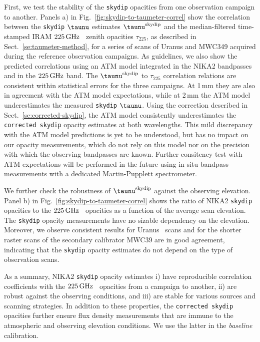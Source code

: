 First, we test the stability of the {\tt skydip} opacities from one
observation campaign to
another. Panels a) in Fig.~\ref{fig:skydip-to-taumeter-correl} show the
correlation between the {\tt skydip} $\taunu$ estimates $\taunu^{\rm{skydip}}$
and the median-filtered time-stamped IRAM $225\,\rm{GHz}$ \taumeter\ 
zenith opacities $\tau_{225}$, as described in
Sect.~\ref{se:taumeter-method}, for a series of scans
of Uranus and MWC349 acquired during the {\emph reference} observation
campaigns. As guidelines,
we also show the predicted correlations using an ATM model integrated
in the NIKA2 bandpasses and in the $225\,\rm{GHz}$ band. {\lp The
$\taunu^{\rm{skydip}}$ to $\tau_{225}$ correlation relations are
consistent within statistical errors for the three campaigns.}
At 1\,mm they are also in agreement with the ATM model expectations,
while at 2\,mm the ATM model underestimates the measured {\tt skydip}
$\taunu$. {\lp Using the correction described in
Sect.~\ref{se:corrected-skydip}, the ATM
model consistently underestimates the {\tt corrected skydip} opacity
estimates at both wavelengths.}
This mild discrepancy with the ATM model predictions is yet to be
understood, but has no impact on
our opacity measurements, which do not rely on this model nor on
the precision with which the observing bandpasses are known. {\lp
Further consitency test with ATM expectations will be performed in the
future using in-situ bandpass measurements with a
dedicated Martin-Pupplett spectrometer.}


We further check the robustness of $\taunu^{\rm{skydip}}$ against the
observing elevation. 
Panel b) in Fig.~\ref{fig:skydip-to-taumeter-correl} shows the ratio of NIKA2
{\tt skydip} opacities to the $225\,\rm{GHz}$ \taumeter\ opacities as a function of
the average scan elevation. The {\tt skydip} opacity measurements have no
sizable dependency on the elevation. Moreover, we observe consistent
results for Uranus \bm\ scans and for
the shorter raster scans of the secondary calibrator MWC39 are in good
agreement, indicating that the {\tt skydip} opacity estimates do not
depend on the type of observation scans. 

As a summary, NIKA2 {\tt skydip} opacity estimates i) have reproducible
correlation coefficients with the $225\,\rm{GHz}$ \taumeter\ opacities from a
campaign to another, ii) are robust against the observing conditions,
and iii) are stable for various sources and scanning strategies. {\lp
In addition to these properties, the {\tt corrected skydip} opacities
further ensure flux density measurements that are immune to the
atmospheric and observing elevation conditions. We use the latter in
the \emph{baseline} calibration.}


